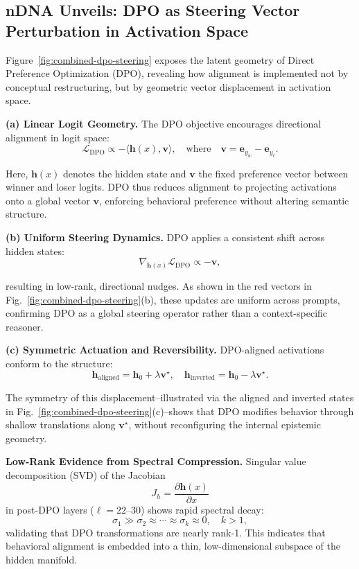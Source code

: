 \noindent

\subsection{nDNA Unveils: DPO as Steering Vector Perturbation in Activation Space}

Figure~\ref{fig:combined-dpo-steering} exposes the latent geometry of Direct Preference Optimization (DPO), revealing how alignment is implemented not by conceptual restructuring, but by geometric vector displacement in activation space.

\textbf{(a) Linear Logit Geometry.} The DPO objective encourages directional alignment in logit space:
\[
\mathcal{L}_{\mathrm{DPO}} \propto -\langle \mathbf{h}(x), \mathbf{v} \rangle, \quad \text{where} \quad \mathbf{v} = \mathbf{e}_{y_w} - \mathbf{e}_{y_\ell}.
\]

Here, \( \mathbf{h}(x) \) denotes the hidden state and \( \mathbf{v} \) the fixed preference vector between winner and loser logits. DPO thus reduces alignment to projecting activations onto a global vector \( \mathbf{v} \), enforcing behavioral preference without altering semantic structure.

\textbf{(b) Uniform Steering Dynamics.} DPO applies a consistent shift across hidden states:
\[
\nabla_{\mathbf{h}(x)} \mathcal{L}_{\mathrm{DPO}} \propto -\mathbf{v},
\]

resulting in low-rank, directional nudges. As shown in the red vectors in Fig.~\ref{fig:combined-dpo-steering}(b), these updates are uniform across prompts, confirming DPO as a global steering operator rather than a context-specific reasoner.

\textbf{(c) Symmetric Actuation and Reversibility.} DPO-aligned activations conform to the structure:
\[
\mathbf{h}_{\mathrm{aligned}} = \mathbf{h}_0 + \lambda \mathbf{v}^\star, \quad \mathbf{h}_{\mathrm{inverted}} = \mathbf{h}_0 - \lambda \mathbf{v}^\star.
\]

The symmetry of this displacement--illustrated via the aligned and inverted states in Fig.~\ref{fig:combined-dpo-steering}(c)--shows that DPO modifies behavior through shallow translations along \( \mathbf{v}^\star \), without reconfiguring the internal epistemic geometry.

\vspace{1mm}
\textbf{Low-Rank Evidence from Spectral Compression.}
Singular value decomposition (SVD) of the Jacobian
\[
J_h = \frac{\partial \mathbf{h}(x)}{\partial x}
\]
in post-DPO layers (\( \ell = 22\text{--}30 \)) shows rapid spectral decay:
\[
\sigma_1 \gg \sigma_2 \approx \cdots \approx \sigma_k \approx 0, \quad k > 1,
\]
validating that DPO transformations are nearly rank-1. This indicates that behavioral alignment is embedded into a thin, low-dimensional subspace of the hidden manifold.

